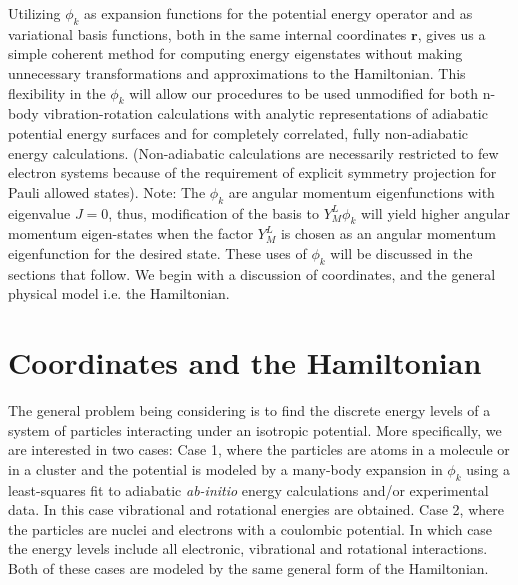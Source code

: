 \documentclass[12pt,thmsa]{article}
\begin{document}
Utilizing $\phi _k$ as expansion functions for the potential energy operator
and as variational basis functions, both in the same internal coordinates $%
\mathbf{r}$, gives us a simple coherent method for computing energy
eigenstates without making unnecessary transformations and approximations to
the Hamiltonian. This flexibility in the $\phi _k$ will allow our procedures
to be used unmodified for both n-body vibration-rotation calculations with
analytic representations of adiabatic potential energy surfaces and for
completely correlated, fully non-adiabatic energy calculations.
(Non-adiabatic calculations are necessarily restricted to few electron
systems because of the requirement of explicit symmetry projection for Pauli
allowed states). Note: The $\phi _k$ are angular momentum eigenfunctions
with eigenvalue $J=0$, thus, modification of the basis to $Y_M^L\phi _k$
will yield higher angular momentum eigen-states when the factor $Y_M^L$ is
chosen as an angular momentum eigenfunction for the desired state. These
uses of $\phi _k$ will be discussed in the sections that follow. We begin
with a discussion of coordinates, and the general physical model i.e. the
Hamiltonian.

\section{ Coordinates and the Hamiltonian}

The general problem being considering is to find the discrete energy levels
of a system of particles interacting under an isotropic potential. More
specifically, we are interested in two cases: Case 1, where the particles
are atoms in a molecule or in a cluster and the potential is modeled by a
many-body expansion in $\phi _k$ using a least-squares fit to adiabatic 
\textit{ab-initio} energy calculations and/or experimental data. In this
case vibrational and rotational energies are obtained. Case 2, where the
particles are nuclei and electrons with a coulombic potential. In which case
the energy levels include all electronic, vibrational and rotational
interactions. Both of these cases are modeled by the same general form of
the Hamiltonian.
\end{document}
